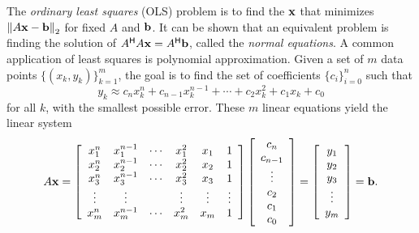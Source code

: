 The \emph{ordinary least squares} (OLS) problem is to find the $\mathbf{x}$ that minimizes $\left\lVert A\mathbf{x} -\mathbf{b}\right\rVert_2$ for fixed $A$ and $\mathbf{b}$.
It can be shown that an equivalent problem is finding the solution of $A^{\mathsf H} A\mathbf{x} =A^{\mathsf H} \mathbf{b}$, called the \emph{normal equations}.
%
A common application of least squares is polynomial approximation.
Given a set of $m$ data points $\{(x_k, y_k)\}_{k=1}^m$, the goal is to find the set of coefficients $\{c_i\}_{i=0}^n$ such that
\[
y_k \approx c_n x_k^n + c_{n-1} x_k^{n-1} + \cdots + c_2 x_k^2 + c_1 x_k + c_0
\]
for all $k$, with the smallest possible error.
These $m$ linear equations yield the linear system
\begin{equation}
A\mathbf{x} =
\left[\begin{array}{cccccc}
x_1^n & x_1^{n-1} & \cdots & x_1^2 & x_1 & 1 \\
x_2^n & x_2^{n-1} & \cdots & x_2^2 & x_2 & 1 \\
x_3^n & x_3^{n-1} & \cdots & x_3^2 & x_3 & 1 \\
\vdots & \vdots & & \vdots & \vdots & \vdots \\
x_m^n & x_m^{n-1} & \cdots & x_m^2 & x_m & 1 \\
\end{array}\right]
\left[\begin{array}{c}
c_n \\ c_{n-1} \\ \vdots \\ c_2 \\ c_1 \\ c_0
\end{array}\right]
=
\left[\begin{array}{c} y_1 \\ y_2 \\ y_3 \\ \vdots \\ y_m \end{array}\right]
= \mathbf{b}.
\label{eq:condstab-poly-leastsq}
\end{equation}

